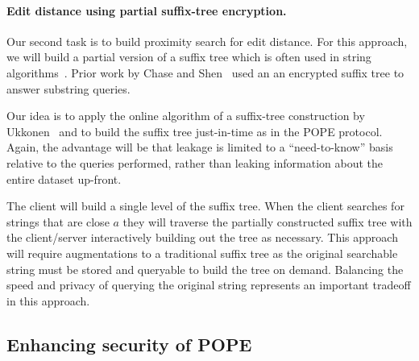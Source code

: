 \paragraph{Edit distance using partial suffix-tree encryption.}
Our second task is to build proximity search for edit distance.  For this
approach, we will build a partial version of a suffix tree which is often used
in string algorithms~\cite{mccreight1976space}.  Prior work by Chase and
Shen~\cite{chase2015substring} used an an encrypted suffix tree to answer
substring queries.

Our idea is to apply the online algorithm of a suffix-tree construction by
Ukkonen~\cite{Ukkonen95} and to build the suffix tree just-in-time as in
the POPE protocol. Again, the advantage will be that leakage is limited
to a ``need-to-know'' basis relative to the queries performed, rather
than leaking information about the entire dataset up-front.

The client will build a single level of the
suffix tree.  When the client searches for strings that are close $a$ they will
traverse the partially constructed suffix tree with the client/server
interactively building out the tree as necessary.  This approach will require
augmentations to a traditional suffix tree as the original searchable string
must be stored and queryable to build the tree on demand.  Balancing the speed
and privacy of querying the original string represents an important tradeoff in
this approach.

\subsection{Enhancing security of POPE}
\iffalse
Many of these defenses are designed to defeat leakage inference attacks.  The first approach is \emph{modularity} in the
sense of modular order-preserving encryption (M-OPE)~\cite{C:BolCheONe11}.  The
idea of M-OPE is to apply a secret random offset modulo the largest possible
message to a message before encrypting it (the secret random offset is chosen
once and fixed in the secret key), so that everything gets ``shifted.''
Since attacks still seem to apply to M-OPE, we propose to investigate more
fine-grained modularity as a defense. 

\paragraph{Random offset for each digit.}
We propose \emph{digit-modular} OPE (DM-OPE) where there is a
secret modular offset applied to each digit.  The base in which the data is
written could even itself be secret.  It becomes more complicated to make range
queries with DM-OPE, as it requires an exponential number of queries in the
number of ``wrap around'' digits in the query.  However, we propose to
investigate approximating the queries efficiently (with some false positives
that the client can filter out).
\fi

